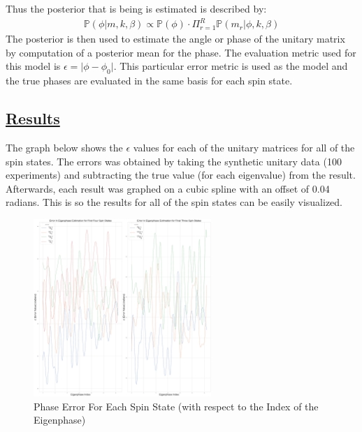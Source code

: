 \documentclass[
]{article}
\begin{document}
\vspace{-0.2cm}

Thus the posterior that is being is estimated is described by:
\vspace{-0.2cm} \begin{align*}
     \mathbb{P}(\phi \vert m, k, \beta) \propto \mathbb{P}(\phi) \cdot \Pi^R_{r=1} \mathbb{P}(m_r \vert \phi, k, \beta)
\end{align*} \vspace{-0.1cm} The posterior is then used to estimate the
angle or phase of the unitary matrix by computation of a posterior mean
for the phase. The evaluation metric used for this model is
\(\epsilon =  \vert \phi - \phi_{0} \vert\). This particular error
metric is used as the model and the true phases are evaluated in the
same basis for each spin state.

\subsection*{\texorpdfstring{\underline{Results}}{}}\label{section-5}

The graph below shows the \(\epsilon\) values for each of the unitary
matrices for all of the spin states. The errors was obtained by taking
the synthetic unitary data (100 experiments) and subtracting the true
value (for each eigenvalue) from the result. Afterwards, each result was
graphed on a cubic spline with an offset of 0.04 radians. This is so the
results for all of the spin states can be easily visualized.

\begin{figure}[H]
\centering
\caption{Phase Error For Each Spin State (with respect to the Index of the Eigenphase)}
\includegraphics[width=0.6\textwidth]{tex/2D_graph.png}
\end{figure}
\end{document}
